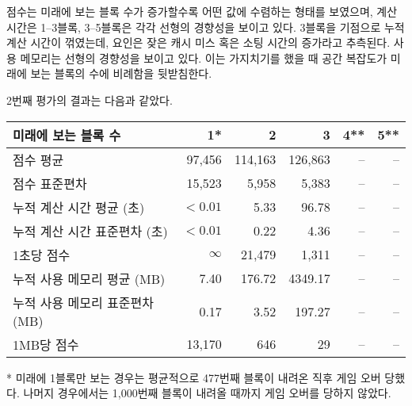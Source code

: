 \begin{figure}
{
    }%
\end{figure}

점수는 미래에 보는 블록 수가 증가할수록 어떤 값에 수렴하는 형태를 보였으며,
계산 시간은 1--3블록, 3--5블록은 각각 선형의 경향성을 보이고 있다. 3블록을 기점으로
누적 계산 시간이 꺾였는데, 요인은 잦은 캐시 미스 혹은 소팅 시간의 증가라고 추측된다.
사용 메모리는 선형의 경향성을 보이고 있다. 이는 가지치기를 했을 때 공간 복잡도가 미래에
보는 블록의 수에 비례함을 뒷받침한다.

2번째 평가의 결과는 다음과 같았다.
\begin{center}
    \begin{tabular}{l|r|r|r|r|r}
        미래에 보는 블록 수 & 1* & 2 & 3 & 4** & 5** \\
        \hline
        점수 평균 & 97,456 & 114,163 & 126,863 & -- & -- \\
        점수 표준편차 & 15,523 & 5,958 & 5,383 & -- & -- \\
        \hline
        누적 계산 시간 평균 (초) & $<0.01$ & 5.33 & 96.78 & -- & -- \\
        누적 계산 시간 표준편차 (초) & $<0.01$ & 0.22 & 4.36 & -- & -- \\
        1초당 점수 & $\infty$ & 21,479 & 1,311 & -- & -- \\
        \hline
        누적 사용 메모리 평균 (MB) & 7.40 & 176.72 & 4349.17 & -- & -- \\
        누적 사용 메모리 표준편차 (MB) & 0.17 & 3.52 & 197.27 & -- & -- \\
        1MB당 점수 & 13,170 & 646 & 29 & -- & -- \\
    \end{tabular}
\end{center}
* 미래에 1블록만 보는 경우는 평균적으로 477번째 블록이 내려온 직후 게임 오버 당했다.
나머지 경우에서는 1,000번째 블록이 내려올 때까지 게임 오버를 당하지 않았다.

